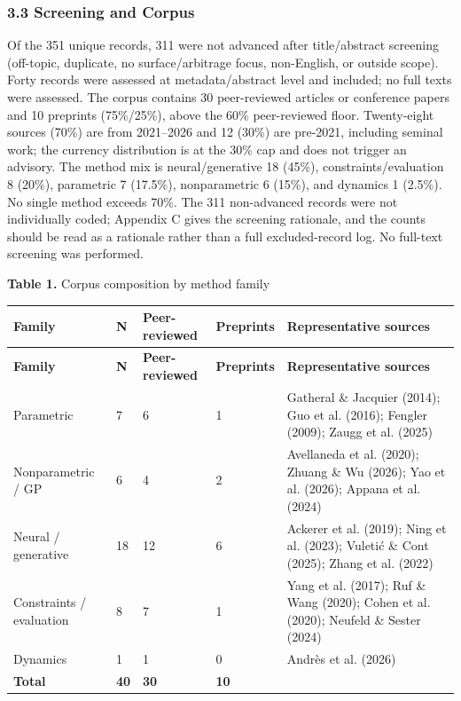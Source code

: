 \documentclass[11pt]{article}
\begin{document}
\subsubsection*{3.3 Screening and Corpus}
Of the 351 unique records, 311 were not advanced after title/abstract screening (off-topic, duplicate, no surface/arbitrage focus, non-English, or outside scope). Forty records were assessed at metadata/abstract level and included; no full texts were assessed. The corpus contains 30 peer-reviewed articles or conference papers and 10 preprints (75\%/25\%), above the 60\% peer-reviewed floor. Twenty-eight sources (70\%) are from 2021–2026 and 12 (30\%) are pre-2021, including seminal work; the currency distribution is at the 30\% cap and does not trigger an advisory. The method mix is neural/generative 18 (45\%), constraints/evaluation 8 (20\%), parametric 7 (17.5\%), nonparametric 6 (15\%), and dynamics 1 (2.5\%). No single method exceeds 70\%. The 311 non-advanced records were not individually coded; Appendix C gives the screening rationale, and the counts should be read as a rationale rather than a full excluded-record log. No full-text screening was performed.

\textbf{Table 1.} Corpus composition by method family

\begingroup\small
\begin{longtable}{@{}p{}p{}p{}p{}p{}@{}}
\toprule
\textbf{Family} & \textbf{N} & \textbf{Peer-reviewed} & \textbf{Preprints} & \textbf{Representative sources} \\
\midrule
\endfirsthead
\toprule
\textbf{Family} & \textbf{N} & \textbf{Peer-reviewed} & \textbf{Preprints} & \textbf{Representative sources} \\
\midrule
\endhead
Parametric & 7 & 6 & 1 & Gatheral \& Jacquier (2014); Guo et al. (2016); Fengler (2009); Zaugg et al. (2025) \\
Nonparametric / GP & 6 & 4 & 2 & Avellaneda et al. (2020); Zhuang \& Wu (2026); Yao et al. (2026); Appana et al. (2024) \\
Neural / generative & 18 & 12 & 6 & Ackerer et al. (2019); Ning et al. (2023); Vuletić \& Cont (2025); Zhang et al. (2022) \\
Constraints / evaluation & 8 & 7 & 1 & Yang et al. (2017); Ruf \& Wang (2020); Cohen et al. (2020); Neufeld \& Sester (2024) \\
Dynamics & 1 & 1 & 0 & Andrès et al. (2026) \\
\textbf{Total} & \textbf{40} & \textbf{30} & \textbf{10} &  \\
\bottomrule
\end{longtable}
\endgroup
\end{document}
